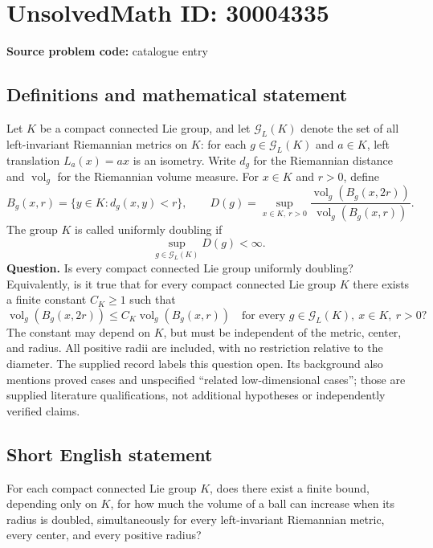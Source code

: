 \documentclass[11pt]{article}
\begin{document}
\section*{UnsolvedMath ID: 30004335}
\textbf{Source problem code:} catalogue entry
\subsection{Definitions and mathematical statement}
Let \(K\) be a compact connected Lie group, and let \(\mathcal G_L(K)\) denote the set of all left-invariant Riemannian metrics on \(K\): for each \(g\in\mathcal G_L(K)\) and \(a\in K\), left translation \(L_a(x)=ax\) is an isometry. Write \(d_g\) for the Riemannian distance and \(\operatorname{vol}_g\) for the Riemannian volume measure. For \(x\in K\) and \(r>0\), define
\[
B_g(x,r)=\{y\in K:d_g(x,y)<r\},
\qquad
D(g)=\sup_{x\in K,\ r>0}
\frac{\operatorname{vol}_g(B_g(x,2r))}{\operatorname{vol}_g(B_g(x,r))}.
\]
The group \(K\) is called uniformly doubling if
\[
\sup_{g\in\mathcal G_L(K)}D(g)<\infty.
\]
\textbf{Question.} Is every compact connected Lie group uniformly doubling? Equivalently, is it true that for every compact connected Lie group \(K\) there exists a finite constant \(C_K\geq 1\) such that
\[
\operatorname{vol}_g(B_g(x,2r))
\leq C_K\operatorname{vol}_g(B_g(x,r))
\quad\text{for every }g\in\mathcal G_L(K),\ x\in K,\ r>0?
\]
The constant may depend on \(K\), but must be independent of the metric, center, and radius. All positive radii are included, with no restriction relative to the diameter. The supplied record labels this question open. Its background also mentions proved cases and unspecified ``related low-dimensional cases''; those are supplied literature qualifications, not additional hypotheses or independently verified claims.
\subsection{Short English statement}
For each compact connected Lie group \(K\), does there exist a finite bound, depending only on \(K\), for how much the volume of a ball can increase when its radius is doubled, simultaneously for every left-invariant Riemannian metric, every center, and every positive radius?
\end{document}
